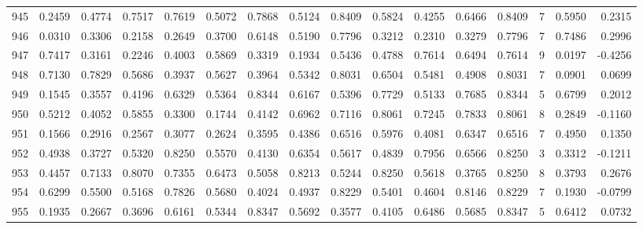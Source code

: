 \begin{tabular}{lrrrrrrrrrrrrrrr}
945 &      0.2459 &  0.4774 &  0.7517 &  0.7619 &  0.5072 &  0.7868 &  0.5124 &  0.8409 &  0.5824 &  0.4255 &   0.6466 &     0.8409 &      7 &                    0.5950 &                     0.2315 \\
946 &      0.0310 &  0.3306 &  0.2158 &  0.2649 &  0.3700 &  0.6148 &  0.5190 &  0.7796 &  0.3212 &  0.2310 &   0.3279 &     0.7796 &      7 &                    0.7486 &                     0.2996 \\
947 &      0.7417 &  0.3161 &  0.2246 &  0.4003 &  0.5869 &  0.3319 &  0.1934 &  0.5436 &  0.4788 &  0.7614 &   0.6494 &     0.7614 &      9 &                    0.0197 &                    -0.4256 \\
948 &      0.7130 &  0.7829 &  0.5686 &  0.3937 &  0.5627 &  0.3964 &  0.5342 &  0.8031 &  0.6504 &  0.5481 &   0.4908 &     0.8031 &      7 &                    0.0901 &                     0.0699 \\
949 &      0.1545 &  0.3557 &  0.4196 &  0.6329 &  0.5364 &  0.8344 &  0.6167 &  0.5396 &  0.7729 &  0.5133 &   0.7685 &     0.8344 &      5 &                    0.6799 &                     0.2012 \\
950 &      0.5212 &  0.4052 &  0.5855 &  0.3300 &  0.1744 &  0.4142 &  0.6962 &  0.7116 &  0.8061 &  0.7245 &   0.7833 &     0.8061 &      8 &                    0.2849 &                    -0.1160 \\
951 &      0.1566 &  0.2916 &  0.2567 &  0.3077 &  0.2624 &  0.3595 &  0.4386 &  0.6516 &  0.5976 &  0.4081 &   0.6347 &     0.6516 &      7 &                    0.4950 &                     0.1350 \\
952 &      0.4938 &  0.3727 &  0.5320 &  0.8250 &  0.5570 &  0.4130 &  0.6354 &  0.5617 &  0.4839 &  0.7956 &   0.6566 &     0.8250 &      3 &                    0.3312 &                    -0.1211 \\
953 &      0.4457 &  0.7133 &  0.8070 &  0.7355 &  0.6473 &  0.5058 &  0.8213 &  0.5244 &  0.8250 &  0.5618 &   0.3765 &     0.8250 &      8 &                    0.3793 &                     0.2676 \\
954 &      0.6299 &  0.5500 &  0.5168 &  0.7826 &  0.5680 &  0.4024 &  0.4937 &  0.8229 &  0.5401 &  0.4604 &   0.8146 &     0.8229 &      7 &                    0.1930 &                    -0.0799 \\
955 &      0.1935 &  0.2667 &  0.3696 &  0.6161 &  0.5344 &  0.8347 &  0.5692 &  0.3577 &  0.4105 &  0.6486 &   0.5685 &     0.8347 &      5 &                    0.6412 &                     0.0732 \\

\end{tabular}
